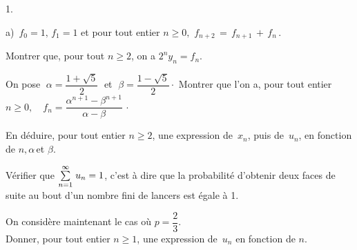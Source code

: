 \documentclass[11pt]{article}%
\begin{document}
\begin{noliste}{1.}
\begin{noliste}{a)}
$\,f_{0} = 1,\,f_{1} = 1\,\,$et pour tout entier $n\geq 
0,\,\,f_{n + 2}\, = \,f_{n + 1}\, + \,f_{n}\,.$

Montrer que, pour tout $n\geq 2$, on a $2^{n}y_{n} = f_{n}$.

\item On pose $\;\alpha = \dfrac{1 + \sqrt{5}}{2}\;$ et $\;\beta =
\dfrac{1-\sqrt{5}}{2}\cdot $ Montrer que l'on a, pour tout entier
$n\geq 0,\quad
f_{n} = \dfrac{\alpha ^{n + 1}-\beta ^{n + 1}}{\alpha -\beta }\,\cdot $

\item En déduire, pour tout entier $n\geq 2$, une expression de
$\,x_{n}
$, puis de $\,u_{n}$, en fonction de $n,\alpha \,$et $\beta $.

\item Vérifier que ${\textstyle\sum\limits_{n = 1}^{\infty }}\hspace{.1cm}u_{n} = 1$, c'est à dire que la
probabilité d'obtenir deux faces de suite au bout d'un nombre fini de
lancers est égale à 1.
\end{noliste}

\item On considère maintenant le cas où $p = \dfrac{2}{3}.$\\
Donner, pour tout entier $n\geq 1$, une expression de $\,u_{n}$ en
fonction de $n$.
\end{noliste}

\label{fin}
\end{document}
